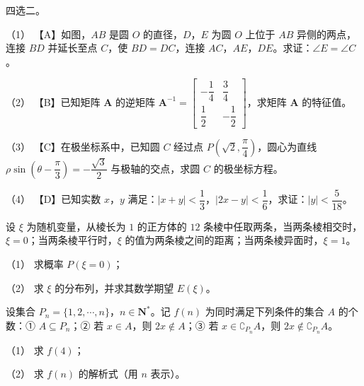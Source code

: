 \Needspace{0.4\textheight}
\begin{question}
四选二。

（1） 【A】如图，$AB$ 是圆 $O$ 的直径，$D$，$E$ 为圆 $O$ 上位于 $AB$ 异侧的两点，连接 $BD$ 并延长至点 $C$，使 $BD=DC$，连接 $AC$，$AE$，$DE$。求证：$\angle E=\angle C$。
\nopagebreak[4]
\begin{center}\end{center}
\nopagebreak[4]
（2） 【B】已知矩阵 $\boldsymbol A$ 的逆矩阵 $\boldsymbol A^{-1}=\begin{bmatrix}-\dfrac14&\dfrac34\\[4pt]\dfrac12&-\dfrac12\end{bmatrix}$，求矩阵 $\boldsymbol A$ 的特征值。

（3） 【C】在极坐标系中，已知圆 $C$ 经过点 $P\left(\sqrt2,\dfrac\pi4\right)$，圆心为直线 $\rho\sin\left(\theta-\dfrac\pi3\right)=-\dfrac{\sqrt3}{2}$ 与极轴的交点，求圆 $C$ 的极坐标方程。

（4） 【D】已知实数 $x$，$y$ 满足：$|x+y|<\dfrac13$，$|2x-y|<\dfrac16$，求证：$|y|<\dfrac{5}{18}$。

\end{question}
\begin{question}
设 $\xi$ 为随机变量，从棱长为 $1$ 的正方体的 $12$ 条棱中任取两条，当两条棱相交时，$\xi=0$；当两条棱平行时，$\xi$ 的值为两条棱之间的距离；当两条棱异面时，$\xi=1$。

（1） 求概率 $P(\xi=0)$；

（2） 求 $\xi$ 的分布列，并求其数学期望 $E(\xi)$。

\end{question}
\begin{question}
设集合 $P_n=\{1,2,\cdots,n\}$，$n\in\mathbf N^*$。记 $f(n)$ 为同时满足下列条件的集合 $A$ 的个数：① $A\subseteq P_n$；② 若 $x\in A$，则 $2x\notin A$；③ 若 $x\in\complement_{P_n}A$，则 $2x\notin\complement_{P_n}A$。

（1） 求 $f(4)$；

（2） 求 $f(n)$ 的解析式（用 $n$ 表示）。

\end{question}